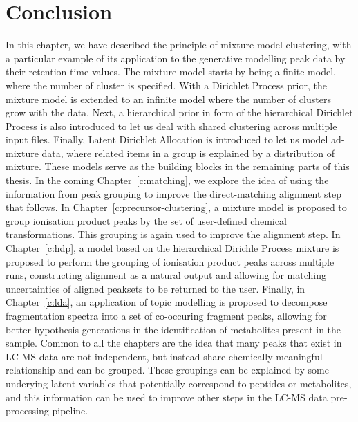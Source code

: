 \section{Conclusion}

In this chapter, we have described the principle of mixture model clustering, with a particular example of its application to the generative modelling peak data by their retention time values. The mixture model starts by being a finite model, where the number of cluster is specified. With a Dirichlet Process prior, the mixture model is extended to an infinite model where the number of clusters grow with the data. Next, a hierarchical prior in form of the hierarchical Dirichlet Process is also introduced to let us deal with shared clustering across multiple input files. Finally, Latent Dirichlet Allocation is introduced to let us model ad-mixture data, where related items in a group is explained by a distribution of mixture. These models serve as the building blocks in the remaining parts of this thesis. In the coming Chapter~\ref{c:matching}, we explore the idea of using the information from peak grouping to improve the direct-matching alignment step that follows. In Chapter~\ref{c:precursor-clustering}, a mixture model is proposed to group ionisation product peaks by the set of user-defined chemical transformations. This grouping is again used to improve the alignment step. In Chapter~\ref{c:hdp}, a model based on the hierarchical Dirichle Process mixture is proposed to perform the grouping of ionisation product peaks across multiple runs, constructing alignment as a natural output and allowing for matching uncertainties of aligned peaksets to be returned to the user. Finally, in Chapter~\ref{c:lda}, an application of topic modelling is proposed to decompose fragmentation spectra into a set of co-occuring fragment peaks, allowing for better hypothesis generations in the identification of metabolites present in the sample. Common to all the chapters are the idea that many peaks that exist in LC-MS data are not independent, but instead share chemically meaningful relationship and can be grouped. These groupings can be explained by some underying latent variables that potentially correspond to peptides or metabolites, and this information can be used to improve other steps in the LC-MS data pre-processing pipeline.